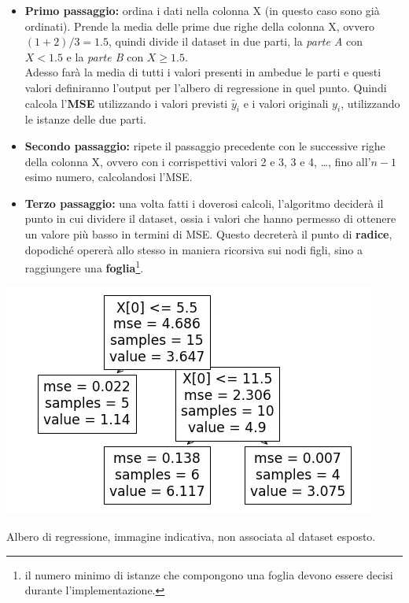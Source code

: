 \documentclass[a4paper, 11pt, oneside]{report}
\begin{document}
                \begin{itemize}
                    \item \textbf{Primo passaggio:} ordina i dati nella colonna X (in questo caso sono già ordinati).
                    Prende la media delle prime due righe della colonna X, ovvero $(1+2)/3 = 1.5$, quindi divide il dataset
                    in due parti, la \textit{parte A} con $X < 1.5$ e la \textit{parte B} con $X \geq 1.5$.
                    \\Adesso farà la media di tutti i valori presenti in ambedue le parti e questi valori
                    definiranno l'output per l'albero di regressione in quel punto. Quindi calcola l'\textbf{MSE}
                    utilizzando i valori previsti $\tilde{y_i}$ e i valori originali $y_i$, utilizzando le istanze
                    delle due parti.
                    \item \textbf{Secondo passaggio:} ripete il passaggio precedente con le successive righe della colonna
                    X, ovvero con i corrispettivi valori 2 e 3, 3 e 4, \ldots, fino all'$n-1$esimo numero, calcolandosi
                    l'MSE.
                    \item \textbf{Terzo passaggio:} una volta fatti i doverosi calcoli, l'algoritmo deciderà il punto in cui
                    dividere il dataset, ossia i valori che hanno permesso di ottenere un valore più basso in termini di MSE. Questo decreterà
                    il punto di \textbf{radice}, dopodiché opererà allo stesso in maniera ricorsiva sui nodi figli, sino a raggiungere
                    una \textbf{foglia}\footnote{il numero minimo di istanze che compongono una foglia devono essere decisi durante
                    l'implementazione.}.
                \end{itemize}
                \medskip
                \begin{center}
                    \hspace*{5em}\includegraphics[scale=0.7]{albero}
                    \par \noindet Albero di regressione, immagine indicativa, non associata al dataset esposto.
                \end{center}
\end{document}
